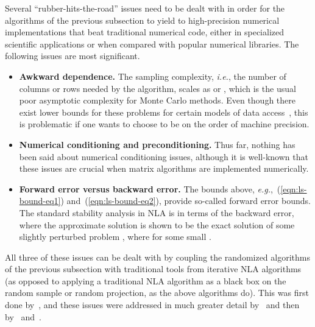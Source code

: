 \documentclass[twoside]{article}
\begin{document}
Several ``rubber-hits-the-road'' issues need to be dealt with in order for 
the algorithms of the previous subsection to yield to high-precision 
numerical implementations that beat traditional numerical code, either in 
specialized scientific applications or when compared with popular numerical 
libraries.
The following issues are most significant.
\begin{itemize}
\item
\textbf{Awkward  dependence.}
The sampling complexity, \emph{i.e.}, the number of columns or rows needed 
by the algorithm, scales as  or , which is the 
usual poor asymptotic complexity for Monte Carlo methods.
Even though there exist lower bounds for these problems for certain models
of data access~\cite{CW09}, this is problematic if one wants to choose 
 to be on the order of machine precision.
\item
\textbf{Numerical conditioning and preconditioning.}
Thus far, nothing has been said about numerical conditioning issues, although
it is well-known that these issues are crucial when matrix algorithms are 
implemented numerically.
\item
\textbf{Forward error versus backward error.}
The bounds above, \emph{e.g.},~(\ref{eqn:ls-bound-eq1}) 
and~(\ref{eqn:ls-bound-eq2}), provide so-called forward error bounds.
The standard stability analysis in NLA is in terms of the backward error, 
where the approximate solution  is shown to be the exact 
solution of some slightly perturbed problem 
, where 
 for some small .
\end{itemize}
All three of these issues can be dealt with by coupling the randomized 
algorithms of the previous subsection with traditional tools from 
iterative NLA algorithms (as opposed to applying a traditional NLA algorithm 
as a black box on the random sample or random projection, as the above 
algorithms do).
This was first done by~\cite{RT08}, and these issues were addressed in much 
greater detail by~\cite{AMT10} and then by~\cite{CRT11} and~\cite{MSM11_TR}.
\end{document}
